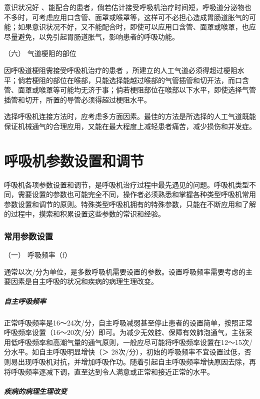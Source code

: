 意识状况好
、能配合的患者，倘若估计接受呼吸机治疗时间短，呼吸道分泌物也不多时，可考虑应用口含管、面罩或喉罩等，这样可不必担心造成胃肠道胀气的可能；如果意识状况不好，又不能配合时，即使可以应用口含管、面罩或喉罩，也应尽量避免，以免引起胃肠道胀气，影响患者的呼吸功能。

\hypertarget{text00369.htmlux5cux23CHP16-3-3-2-6}{}
（六） 气道梗阻的部位

因呼吸道梗阻需接受呼吸机治疗的患者
，所建立的人工气道必须得超过梗阻水平；倘若梗阻的部位在喉部，只能选择能越过喉部的气管插管和切开法，而口含管、面罩或喉罩等可能均无济于事；倘若梗阻部位在喉部以下水平，即使选择气管插管和切开，所置的导管必须得超过梗阻水平。

选择呼吸机连接方法时，应考虑多方面因素。最佳的方法是所选择的人工气道既能保证机械通气的合理应用，又能在最大程度上减轻患者痛苦，减少损伤和并发症。

\protect\hypertarget{text00370.html}{}{}

\section{呼吸机参数设置和调节}

呼吸机各项参数设置和调节，是呼吸机治疗过程中最先遇见的问题。呼吸机类型不同，需要设置的参数也可能完全不同，操作者必须熟悉和掌握各种类型呼吸机常用参数设置和调节的原则。特殊类型呼吸机拥有的特殊参数，只能在不断应用和了解的过程中，摸索和积累设置这些参数的常识和经验。

\subsubsection{常用参数设置}

\hypertarget{text00370.htmlux5cux23CHP16-3-4-1-1}{}
（一） 呼吸频率（f）

通常以次/分为单位，是多数呼吸机需要设置的参数。设置呼吸频率需要考虑的主要因素是自主呼吸的状况和疾病的病理生理改变。

\subparagraph{自主呼吸频率}

正常呼吸频率是16～24次/分，自主呼吸减弱甚至停止患者的设置简单，按照正常呼吸频率设置（16～20次/分）即可。为减少无效腔、保障有效肺泡通气，主张采用低呼吸频率和高潮气量的通气原则，一般应尽可能将呼吸频率设置在12～15次/分水平。如自主呼吸明显增快（＞
28次/分），初始的呼吸频率不宜设置过低，否则易出现呼吸机对抗，并增加呼吸作功。随着引起自主呼吸频率增快原因去除，再将呼吸频率逐减下调，直至达到令人满意或正常和接近正常的水平。

\subparagraph{疾病的病理生理改变}

